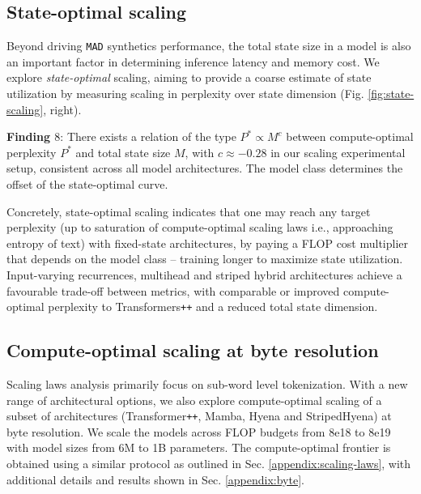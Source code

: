 \subsection{State-optimal scaling}

Beyond driving {\tt MAD} synthetics performance, the total state size in a model is also an important factor in determining inference latency and memory cost. We explore \textit{state-optimal} scaling, aiming to provide a coarse estimate of state utilization by measuring scaling in perplexity over state dimension (Fig. \ref{fig:state-scaling}, right).

\begin{tcolorbox}[enhanced, frame hidden, sharp corners, colback=blue!5, boxsep=2pt, before skip=1pt, after skip=1pt]
   \textbf{Finding $8$}: There exists a relation of the type $P^* \propto M^c$ between compute-optimal perplexity $P^*$ and total state size $M$, with $c \approx -0.28$ in our scaling experimental setup, consistent across all model architectures. The model class determines the offset of the state-optimal curve. 
\end{tcolorbox}

Concretely, state-optimal scaling indicates that one may reach any target perplexity (up to saturation of compute-optimal scaling laws i.e., approaching entropy of text) with fixed-state architectures, by paying a FLOP cost multiplier that depends on the model class -- training longer to maximize state utilization. Input-varying recurrences, multihead and striped hybrid architectures achieve a favourable trade-off between metrics, with comparable or improved compute-optimal perplexity to Transformers{\tt ++} and a reduced total state dimension.

\subsection{Compute-optimal scaling at byte resolution}

Scaling laws analysis primarily focus on sub-word level tokenization. With a new range of architectural options, we also explore compute-optimal scaling of a subset of architectures (Transformer{\tt ++}, Mamba, Hyena and StripedHyena) at byte resolution. We scale the models across FLOP budgets from 8e18 to 8e19 with model sizes from 6M to 1B parameters. The compute-optimal frontier is obtained using a similar protocol as outlined in Sec. \ref{appendix:scaling-laws}, with additional details and results shown in Sec. \ref{appendix:byte}.

